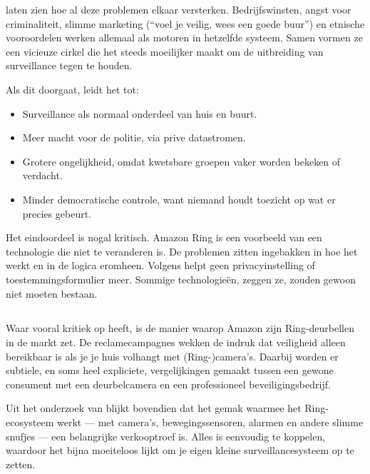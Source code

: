 \documentclass[nonacm,sigconf]{acmart}
\begin{document}
    \noindent\citeauthor{selinger2022amazon} laten zien hoe al deze problemen elkaar versterken.
    Bedrijfswinsten, angst voor criminaliteit, slimme marketing (“voel je veilig, wees een goede buur”) en etnische vooroordelen werken allemaal als motoren in hetzelfde systeem.
    Samen vormen ze een vicieuze cirkel die het steeds moeilijker maakt om de uitbreiding van surveillance tegen te houden.

    \noindent Als dit doorgaat, leidt het tot:
    \begin{itemize}
        \item Surveillance als normaal onderdeel van huis en buurt.
        \item Meer macht voor de politie, via prive datastromen.
        \item Grotere ongelijkheid, omdat kwetsbare groepen vaker worden bekeken of verdacht.
        \item Minder democratische controle, want niemand houdt toezicht op wat er precies gebeurt.
    \end{itemize}

    \noindent Het eindoordeel is nogal kritisch.
    Amazon Ring is een voorbeeld van een technologie die niet te veranderen is.
    De problemen zitten ingebakken in hoe het werkt en in de logica eromheen.
    Volgens \citeauthor{selinger2022amazon} helpt geen privacyinstelling of toestemmingsformulier meer.
    Sommige technologieën, zeggen ze, zouden gewoon niet moeten bestaan.

    \subsection{}

    \parencite{kelly2023ring} Waar \citeauthor{kelly2023ring} vooral kritiek op heeft, is de manier waarop Amazon zijn Ring-deurbellen in de markt zet.
    De reclamecampagnes wekken de indruk dat veiligheid alleen bereikbaar is als je je huis volhangt met (Ring-)camera’s.
    Daarbij worden er subtiele, en soms heel expliciete, vergelijkingen gemaakt tussen een gewone consument met een deurbelcamera en een professioneel beveiligingsbedrijf.

    Uit het onderzoek van \citeauthor{kelly2023ring} blijkt bovendien dat het gemak waarmee het Ring-ecosysteem werkt — met camera’s, bewegingssensoren, alarmen en andere slimme snufjes — een belangrijke verkooptroef is.
    Alles is eenvoudig te koppelen, waardoor het bijna moeiteloos lijkt om je eigen kleine surveillancesysteem op te zetten.
\end{document}
